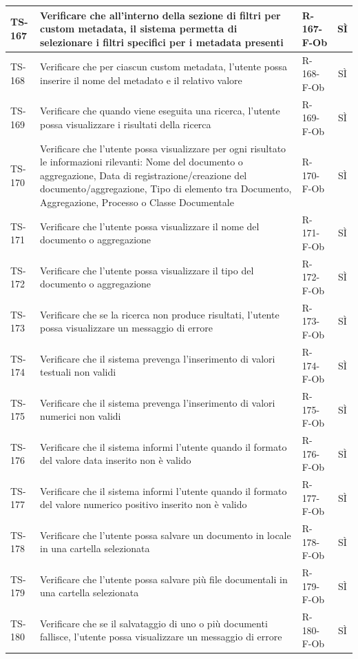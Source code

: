 \documentclass[a4paper,12pt]{article}
\begin{document}
\begin{longtable}{|p{1.5cm}|p{8.3cm}|p{2.4cm}|c|}
\hline
TS-167 & Verificare che all'interno della sezione di filtri per custom metadata, il sistema permetta di selezionare i filtri specifici per i metadata presenti & R-167-F-Ob & SÌ \\
\hline
TS-168 & Verificare che per ciascun custom metadata, l'utente possa inserire il nome del metadato e il relativo valore & R-168-F-Ob & SÌ \\
\hline
TS-169 & Verificare che quando viene eseguita una ricerca, l'utente possa visualizzare i risultati della ricerca & R-169-F-Ob & SÌ \\
\hline
TS-170 & Verificare che l'utente possa visualizzare per ogni risultato le informazioni rilevanti: Nome del documento o aggregazione, Data di registrazione/creazione del documento/aggregazione, Tipo di elemento tra Documento, Aggregazione, Processo o Classe Documentale & R-170-F-Ob & SÌ \\
\hline
TS-171 & Verificare che l'utente possa visualizzare il nome del documento o aggregazione & R-171-F-Ob & SÌ \\
\hline
TS-172 & Verificare che l'utente possa visualizzare il tipo del documento o aggregazione & R-172-F-Ob & SÌ \\
\hline
TS-173 & Verificare che se la ricerca non produce risultati, l'utente possa visualizzare un messaggio di errore & R-173-F-Ob & SÌ \\
\hline
TS-174 & Verificare che il sistema prevenga l'inserimento di valori testuali non validi & R-174-F-Ob & SÌ \\
\hline
TS-175 & Verificare che il sistema prevenga l'inserimento di valori numerici non validi & R-175-F-Ob & SÌ \\
\hline
TS-176 & Verificare che il sistema informi l'utente quando il formato del valore data inserito non è valido & R-176-F-Ob & SÌ \\
\hline
TS-177 & Verificare che il sistema informi l'utente quando il formato del valore numerico positivo inserito non è valido & R-177-F-Ob & SÌ \\
\hline
TS-178 & Verificare che l'utente possa salvare un documento in locale in una cartella selezionata & R-178-F-Ob & SÌ \\
\hline
TS-179 & Verificare che l'utente possa salvare più file documentali in una cartella selezionata & R-179-F-Ob & SÌ \\
\hline
TS-180 & Verificare che se il salvataggio di uno o più documenti fallisce, l'utente possa visualizzare un messaggio di errore & R-180-F-Ob & SÌ \\

\end{longtable}
\end{document}
